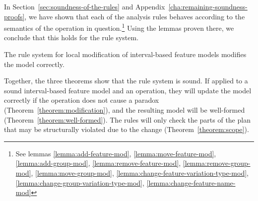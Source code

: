 In Section~\vref{sec:soundness-of-the-rules} and Appendix~\ref{cha:remaining-soundness-proofs}, we have shown that each of the analysis rules behaves according to the semantics of the operation in question.\footnote{See lemmas \ref{lemma:add-feature-mod}, \ref{lemma:move-feature-mod}, \ref{lemma:add-group-mod}, \ref{lemma:remove-feature-mod}, \ref{lemma:remove-group-mod}, \ref{lemma:move-group-mod}, \ref{lemma:change-feature-variation-type-mod}, \ref{lemma:change-group-variation-type-mod}, \ref{lemma:change-feature-name-mod}} Using the lemmas proven there, we conclude that this holds for the rule system.
\\
\begin{theorem}
  The rule system for local modification of interval-based feature models modifies the model correctly.
  \label{theorem:modification}
\end{theorem}

Together, the three theorems show that the rule system is sound. If applied to a sound interval-based feature model and an operation, they will update the model correctly if the operation does not cause a paradox (Theorem~\ref{theorem:modification}), and the resulting model will be well-formed (Theorem~\ref{theorem:well-formed}). The rules will only check the parts of the plan that may be structurally violated due to the change (Theorem~\ref{theorem:scope}).
